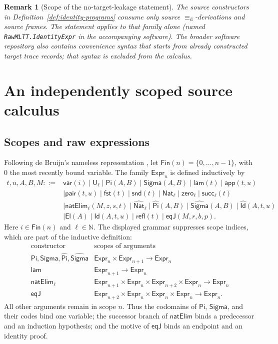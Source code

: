 \documentclass[10pt,reqno]{amsart}
\newtheorem{remark}[theorem]{Remark}
\newcommand{\Fin}{\mathsf{Fin}}
\newcommand{\Expr}{\mathsf{Expr}}
\newcommand{\Var}{\mathsf{var}}
\newcommand{\Sort}{\mathsf{U}}
\newcommand{\PiTy}{\mathsf{Pi}}
\newcommand{\SigmaTy}{\mathsf{Sigma}}
\newcommand{\Lam}{\mathsf{lam}}
\newcommand{\App}{\mathsf{app}}
\newcommand{\Pair}{\mathsf{pair}}
\newcommand{\Fst}{\mathsf{fst}}
\newcommand{\Snd}{\mathsf{snd}}
\newcommand{\NatTy}{\mathsf{Nat}}
\newcommand{\Zero}{\mathsf{zero}}
\newcommand{\Succ}{\mathsf{succ}}
\newcommand{\NatElim}{\mathsf{natElim}}
\newcommand{\CodeNat}{\widehat{\mathsf{Nat}}}
\newcommand{\CodePi}{\widehat{\mathsf{Pi}}}
\newcommand{\CodeSigma}{\widehat{\mathsf{Sigma}}}
\newcommand{\CodeId}{\widehat{\mathsf{Id}}}
\newcommand{\El}{\mathsf{El}}
\newcommand{\IdTy}{\mathsf{Id}}
\newcommand{\Refl}{\mathsf{refl}}
\newcommand{\EqJ}{\mathsf{eqJ}}
\newcommand{\defeq}{\mathrel{\equiv_{\mathrm d}}}
\begin{document}
\begin{remark}[Scope of the no-target-leakage statement]
The source constructors in Definition~\ref{def:identity-programs} consume
only source \(\defeq\)-derivations and source frames.  The statement applies
to that family alone (named \texttt{RawMLTT.IdentityExpr} in the
accompanying software).  The broader software repository also contains
convenience syntax that starts from already constructed target trace records; that
syntax is excluded from the calculus.
\end{remark}

\section{An independently scoped source calculus}
\label{sec:syntax}

\subsection{Scopes and raw expressions}

Following de Bruijn's nameless representation
\cite{deBruijn1972}, let
\(\Fin(n)=\{0,\ldots,n-1\}\), with \(0\) the most recently bound
variable.  The family \(\Expr_n\) is defined inductively by
\begin{align*}
t,u,A,B,M ::= {}&
  \Var(i) \mid \Sort_\ell
  \mid \PiTy(A,B) \mid \SigmaTy(A,B)
  \mid \Lam(t) \mid \App(t,u)\\
 &\mid \Pair(t,u)\mid\Fst(t)\mid\Snd(t)
  \mid \NatTy_\ell\mid\Zero_\ell\mid\Succ_\ell(t)\\
 &\mid \NatElim_\ell(M,z,s,t)
  \mid \CodeNat_\ell\mid\CodePi(A,B)
  \mid\CodeSigma(A,B)\mid\CodeId(A,t,u)\\
 &\mid \El(A)\mid\IdTy(A,t,u)\mid\Refl(t)
  \mid \EqJ(M,r,b,p).
\end{align*}
Here \(i\in\Fin(n)\) and \(\ell\in\mathbb{N}\).  The displayed grammar
suppresses scope indices, which are part of the inductive definition:
\[
\begin{array}{c|c}
\text{constructor} & \text{scopes of arguments}\\ \hline
\PiTy,\SigmaTy,\CodePi,\CodeSigma
  & \Expr_n\times\Expr_{n+1}\to\Expr_n\\
\Lam & \Expr_{n+1}\to\Expr_n\\
\NatElim_\ell
  & \Expr_{n+1}\times\Expr_n\times\Expr_{n+2}
      \times\Expr_n\to\Expr_n\\
\EqJ
  & \Expr_{n+2}\times\Expr_n\times\Expr_n\times\Expr_n
      \to\Expr_n.
\end{array}
\]
All other arguments remain in scope \(n\).  Thus the codomains of
\(\PiTy\), \(\SigmaTy\), and their codes bind one variable; the successor
branch of \(\NatElim\) binds a predecessor and an induction hypothesis; and
the motive of \(\EqJ\) binds an endpoint and an identity proof.
\end{document}
